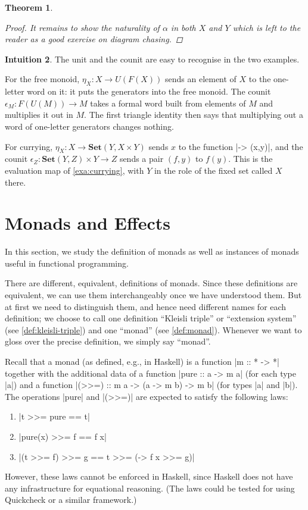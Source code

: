 \documentclass[a4paper,11pt, oneside,titlepage=false]{scrbook}
\newcommand{\KW}[1]{}
\theoremstyle{plain}
\newtheorem{thm}{Theorem}
\theoremstyle{definition}
\newtheorem{intu}[thm]{Intuition}
\newcommand{\Catb}[1]{\mathbf{#1}}
\newcommand{\SET}{\Catb{Set}}
\newcommand{\CHom}[3]{{#1}(#2,#3)}
\begin{document}
\begin{thm}
\begin{proof}
It remains to show the naturality of $\alpha$ in both $X$ and $Y$ which is left to the reader as a good exercise on diagram chasing. %
\end{proof}
\end{thm}

\begin{intu}
  The unit and the counit are easy to recognise in the two examples.

  For the free monoid, $\eta_X : X \to U(F(X))$ sends an element of $X$ to the
  one-letter word on it: it puts the generators into the free monoid.
  The counit $\epsilon_M : F(U(M)) \to M$ takes a formal word built from
  elements of $M$ and multiplies it out in $M$.
  The first triangle identity then says that multiplying out a word of
  one-letter generators changes nothing.

  For currying, $\eta_X : X \to \CHom{\SET}{Y}{X \times Y}$ sends $x$ to the
  function |\y -> (x,y)|, and the counit
  $\epsilon_Z : \CHom{\SET}{Y}{Z} \times Y \to Z$ sends a pair $(f,y)$ to
  $f(y)$.
  This is the evaluation map of \cref{exa:currying}, with $Y$ in the role of
  the fixed set called $X$ there.
\end{intu}


\chapter{Monads and Effects}
\label{sec:monads}

In this section, we study the definition of monads as well as instances of monads useful in functional programming.

There are different, equivalent, definitions of monads.
Since these definitions are equivalent, we can use them interchangeably once we have understood them.
But at first we need to distinguish them, and hence need different names for each definition; we choose to call one definition ``Kleisli triple'' or ``extension system'' (see \cref{def:kleisli-triple}) and one ``monad'' (see \cref{def:monad}).
Whenever we want to gloss over the precise definition, we simply say ``monad''.


Recall that a monad (as defined, e.g., in Haskell) is a function |m :: * -> *| together with the additional data of a function |pure :: a -> m a| (for each type |a|) and a function |(>>=) :: m a -> (a -> m b) -> m b| (for types |a| and |b|).
The operations |pure| and |(>>=)| are expected to satisfy the following laws:
\begin{enumerate}
\item |t >>= pure == t| %
\item |pure(x) >>= f == f x| %
\item |(t >>= f) >>= g == t >>= (\x -> f x >>= g)|%
\end{enumerate}
However, these laws cannot be enforced in Haskell, since Haskell does not have any infrastructure for equational reasoning.
(The laws could be tested for using Quickcheck or a similar framework.)
\end{document}
